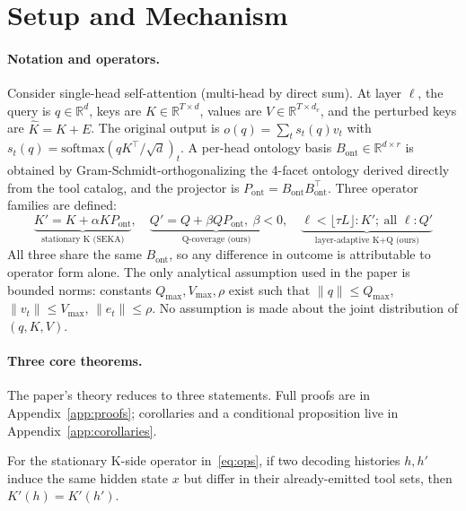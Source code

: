 \section{Setup and Mechanism}\label{sec:theory}

\paragraph{Notation and operators.}
Consider single-head self-attention (multi-head by direct sum). At layer $\ell$, the query is $q\in\mathbb{R}^d$, keys are $K\in\mathbb{R}^{T\times d}$, values are $V\in\mathbb{R}^{T\times d_v}$, and the perturbed keys are $\hat K = K + E$. The original output is $o(q) = \sum_t s_t(q) v_t$ with $s_t(q) = \mathrm{softmax}(qK^\top/\sqrt d)_t$. A per-head ontology basis $B_{\mathrm{ont}}\in\mathbb{R}^{d\times r}$ is obtained by Gram-Schmidt-orthogonalizing the 4-facet ontology derived directly from the tool catalog, and the projector is $P_{\mathrm{ont}} = B_{\mathrm{ont}} B_{\mathrm{ont}}^\top$. Three operator families are defined:
\begin{equation}\label{eq:ops}
\underbrace{K' = K + \alpha K P_{\mathrm{ont}}}_{\text{stationary K (SEKA)}},\quad
\underbrace{Q' = Q + \beta Q P_{\mathrm{ont}},\ \beta<0}_{\text{Q-coverage (ours)}},\quad
\underbrace{\ell<\lfloor\tau L\rfloor\!:K';\ \text{all }\ell\!:Q'}_{\text{layer-adaptive K+Q (ours)}}
\end{equation}
All three share the same $B_{\mathrm{ont}}$, so any difference in outcome is attributable to operator form alone. The only analytical assumption used in the paper is bounded norms: constants $Q_{\max}, V_{\max}, \rho$ exist such that $\|q\|\le Q_{\max}$, $\|v_t\|\le V_{\max}$, $\|e_t\|\le\rho$. No assumption is made about the joint distribution of $(q, K, V)$.

\paragraph{Three core theorems.}
The paper's theory reduces to three statements. Full proofs are in Appendix~\ref{app:proofs}; corollaries and a conditional proposition live in Appendix~\ref{app:corollaries}.

\begin{theorem}\label{thm:no-memory}
For the stationary K-side operator in~\eqref{eq:ops}, if two decoding histories $h, h'$ induce the same hidden state $x$ but differ in their already-emitted tool sets, then $K'(h) = K'(h')$.
\end{theorem}

